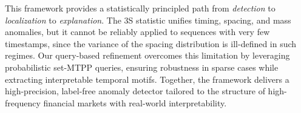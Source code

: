 This framework provides a statistically principled path from \emph{detection} to \emph{localization} to \emph{explanation}.  
The 3S statistic unifies timing, spacing, and mass anomalies, but it cannot be reliably applied to sequences with very few timestamps, since the variance of the spacing distribution is ill-defined in such regimes. Our query-based refinement overcomes this limitation by leveraging probabilistic set-MTPP queries, ensuring robustness in sparse cases while extracting interpretable temporal motifs. Together, the framework delivers a high-precision, label-free anomaly detector tailored to the structure of high-frequency financial markets with real-world interpretability.


